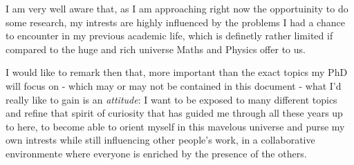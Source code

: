 \documentclass[12pt, a4paper]{article}
\begin{document}
I am very well aware that, as I am approaching right now the opportuinity to do some research, my intrests are highly influenced by the problems I had a chance to encounter in my previous academic life, which is definetly rather limited if compared to the huge and rich universe Maths and Physics offer to us.

I would like to remark then that, more important than the exact topics my PhD will focus on - which may or may not be contained in this document - what I'd really like to gain is an \emph{attitude}: I want to be exposed to many different topics and refine that spirit of curiosity that has guided me through all these years up to here, to become able to orient myself in this mavelous universe and purse my own intrests while still influencing other people's work, in a collaborative environmente where everyone is enriched by the presence of the others.

\clearpage


\printbibliography
\end{document}
